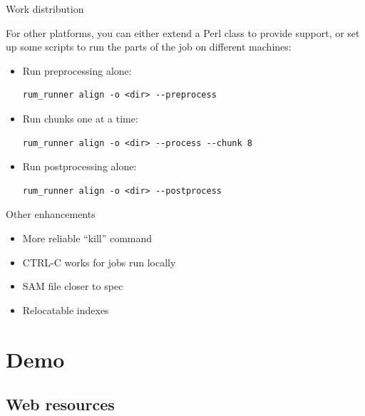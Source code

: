 \documentclass{beamer}
\begin{document}
\begin{frame}[fragile]{Work distribution}

For other platforms, you can either extend a Perl class to provide
support, or set up some scripts to run the parts of the job on
different machines:

\pause

\begin{itemize}
\item  Run preprocessing alone:

\begin{verbatim}
rum_runner align -o <dir> --preprocess
\end{verbatim}

\pause

\item Run chunks one at a time:

\begin{verbatim}
rum_runner align -o <dir> --process --chunk 8
\end{verbatim}

\pause

\item Run postprocessing alone:

\begin{verbatim}
rum_runner align -o <dir> --postprocess
\end{verbatim}

\end{itemize}

\end{frame}

\begin{frame}{Other enhancements}
  \begin{itemize}
  \item More reliable ``kill'' command
  \item CTRL-C works for jobs run locally
  \item SAM file closer to spec
  \item Relocatable indexes
  \end{itemize}
  
\end{frame}

\section{Demo}

\subsection{Web resources}
\end{document}
